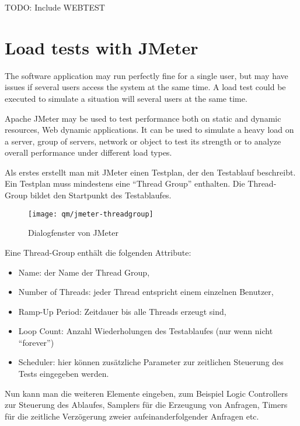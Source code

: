 %
%
\newpage
TODO: Include WEBTEST
\newpage

%
\section{Load tests with JMeter}
The software application may run perfectly fine for a single user,
but may have issues if several users access the system at the same
time. A load test could be executed to simulate a situation will
several users at the same time.

\vspace{3mm}

Apache JMeter may be used to test performance both on static and
dynamic resources, Web dynamic applications.
It can be used to simulate a heavy load on a server,
group of servers, network or object to test its strength or to
analyze overall performance under different load types.




Als erstes erstellt man mit JMeter einen Testplan, der den Testablauf
beschreibt. Ein Testplan muss mindestens eine ``Thread Group'' enthalten.
Die Thread-Group bildet den Startpunkt des Testablaufes.
\begin{figure}[H]
\centering
\texttt{[image: qm/jmeter-threadgroup]}
\caption{Dialogfenster von JMeter}
\end{figure}
\newslide
Eine Thread-Group enthält die folgenden Attribute:
\begin{itemize}
\item Name: der Name der Thread Group,
\item Number of Threads: jeder Thread entspricht einem einzelnen
  Benutzer,%
\item Ramp-Up Period: Zeitdauer bis alle Threads erzeugt sind,
\item Loop Count: Anzahl Wiederholungen des Testablaufes (nur wenn nicht
  ``forever'')
\item Scheduler: hier können zusätzliche Parameter zur zeitlichen Steuerung des
  Tests eingegeben werden.
\end{itemize}
Nun kann man die weiteren Elemente eingeben, zum Beispiel Logic Controllers zur
Steuerung des Ablaufes, Samplers für die Erzeugung von Anfragen, Timers für
die zeitliche Verzögerung zweier aufeinanderfolgender Anfragen etc.

